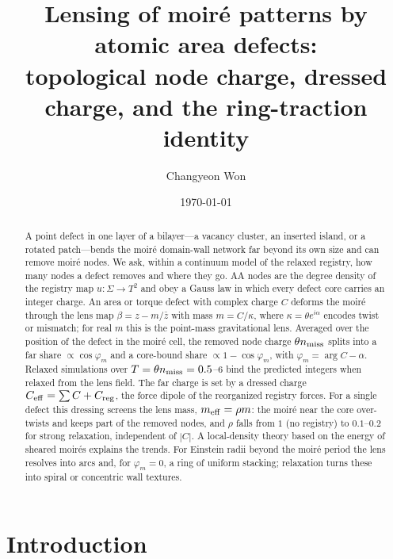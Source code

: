 \documentclass[prb,twocolumn,superscriptaddress,floatfix,10pt]{revtex4-2}
\begin{document}
\title{Lensing of moir\'e patterns by atomic area defects:\\ topological node charge, dressed charge, and the ring-traction identity}

\author{Changyeon Won}

\date{\today}

\begin{abstract}
A point defect in one layer of a bilayer---a vacancy cluster, an inserted island, or a rotated patch---bends the moir\'e domain-wall network far beyond its own size and can remove moir\'e nodes. We ask, within a continuum model of the relaxed registry, how many nodes a defect removes and where they go. AA nodes are the degree density of the registry map $u:\Sigma\to T^2$ and obey a Gauss law in which every defect core carries an integer charge. An area or torque defect with complex charge $C$ deforms the moir\'e through the lens map $\beta=z-m/\bar z$ with mass $m=C/\kappa$, where $\kappa=\theta e^{i\alpha}$ encodes twist or mismatch; for real $m$ this is the point-mass gravitational lens. Averaged over the position of the defect in the moir\'e cell, the removed node charge $\theta n_{\rm miss}$ splits into a far share $\propto\cos\varphi_m$ and a core-bound share $\propto1-\cos\varphi_m$, with $\varphi_m=\arg C-\alpha$. Relaxed simulations over $T=\theta n_{\rm miss}=0.5$--$6$ bind the predicted integers when relaxed from the lens field. The far charge is set by a dressed charge $C_{\rm eff}=\sum C+C_{\rm reg}$, the force dipole of the reorganized registry forces. For a single defect this dressing screens the lens mass, $m_{\rm eff}=\rho m$: the moir\'e near the core over-twists and keeps part of the removed nodes, and $\rho$ falls from $1$ (no registry) to $0.1$--$0.2$ for strong relaxation, independent of $|C|$. A local-density theory based on the energy of sheared moir\'es explains the trends. For Einstein radii beyond the moir\'e period the lens resolves into arcs and, for $\varphi_m=0$, a ring of uniform stacking; relaxation turns these into spiral or concentric wall textures.
\end{abstract}

\maketitle

\section{Introduction}
\end{document}
